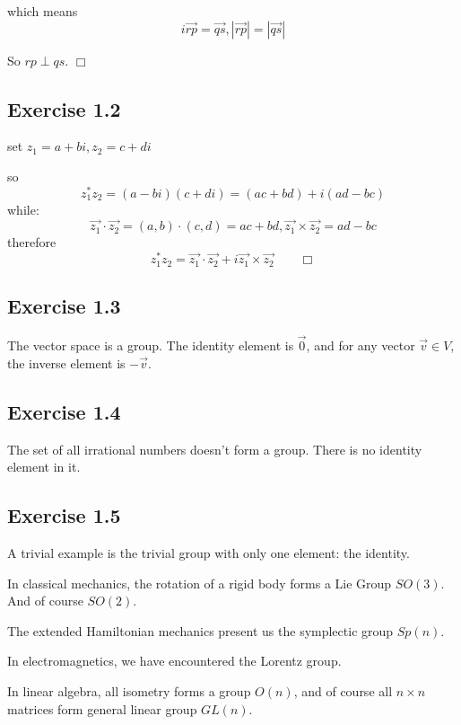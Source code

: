 \documentclass[]{ctexart}
\begin{document}
	which means
	\begin{equation*}
		i\vec{rp}=\vec{qs},|\vec{rp}|=|\vec{qs}|
	\end{equation*}
	
	So $rp \perp qs$. $\Box$
	
	\subsection{Exercise 1.2}
	set $z_1=a+bi,z_2=c+di$
	
	so 
	\begin{equation*}
		z_1^*z_2=(a-bi)(c+di)=(ac+bd)+i(ad-bc)
	\end{equation*}
	while:
	\begin{equation*}
	\vec{z_1}\cdot \vec{z_2}=(a,b) \cdot (c,d)=ac+bd,\vec{z_1}\times \vec{z_2}=ad-bc
	\end{equation*}
	therefore
	\begin{equation*}
	z_1^*z_2=\vec{z_1}\cdot \vec{z_2}+i\vec{z_1}\times \vec{z_2} \qquad \Box
	\end{equation*}
	
	\subsection{Exercise 1.3}
	The vector space is a group. The identity element is $\vec{0}$, and for any vector $\vec{v}\in V$, the inverse element is $-\vec{v}$.
	
	\subsection{Exercise 1.4}
	The set of all irrational numbers doesn't form a group. There is no identity element  in it. 
	
	\subsection{Exercise 1.5}
	A trivial example is the trivial group with only one element: the identity. 
	
	In classical mechanics, the rotation of a rigid body forms a Lie Group $SO(3)$. And of course $SO(2)$. 
	
	The extended Hamiltonian mechanics present us the symplectic group $Sp(n)$.
	
	In electromagnetics, we have encountered the Lorentz group.
	
	In linear algebra, all isometry forms a group $O(n)$, and of course all $n \times n$ matrices form general linear group $GL(n)$.
	
\end{document}

